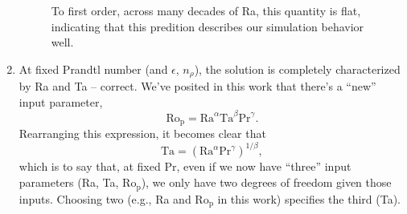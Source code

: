 \documentclass[aps, pre, onecolumn, nofootinbib, notitlepage, groupedaddress, amsfonts, amssymb, amsmath, longbibliography, superscriptaddress]{revtex4-1}
\begin{document}
\begin{enumerate}
\begin{figure}[t!]
{	To first order, across many decades of Ra, this quantity is flat, indicating that this predition describes our simulation behavior well.
	\label{fig:ro_p_boundary_layers} }
\end{figure}
\item At fixed Prandtl number (and $\epsilon$, $n_\rho$), the solution is completely characterized by Ra and Ta -- correct.
We've posited in this work that there's a ``new'' input parameter,
\begin{equation}
\text{Ro}_\text{p} = \text{Ra}^\alpha\text{Ta}^\beta\text{Pr}^{\gamma}.
\end{equation}
Rearranging this expression, it becomes clear that
\begin{equation}
\text{Ta} = \left(\text{Ra}^\alpha\text{Pr}^{\gamma}\right)^{1/\beta},
\end{equation}
which is to say that, at fixed Pr, even if we now have ``three'' input parameters (Ra, Ta, Ro$_{\text{p}}$), we only have two degrees of freedom given those inputs.
Choosing two (e.g., Ra and Ro$_\text{p}$ in this work) specifies the third (Ta).


\end{enumerate}
\end{document}
